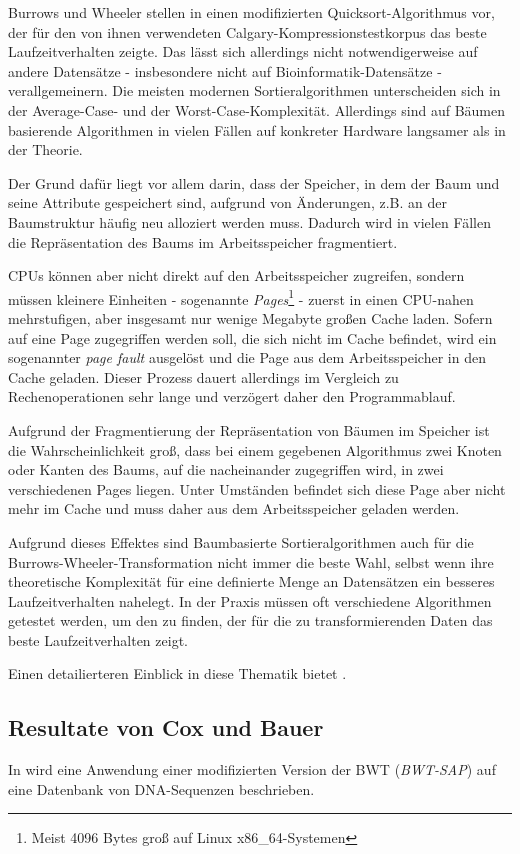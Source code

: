 \documentclass[ngerman,pdftex,paper=A4,DIV=calc,titlepage,12pt]{scrartcl}
\newtheorem[L]{boxedDefinition}{Definition}
\begin{document}
Burrows und Wheeler stellen in \cite{burrows1994block} einen modifizierten Quicksort-Algorithmus vor, der für den von ihnen verwendeten Calgary-Kompressionstestkorpus das beste Laufzeitverhalten zeigte. Das lässt sich allerdings nicht notwendigerweise auf andere Datensätze - insbesondere nicht auf Bioinformatik-Datensätze - verallgemeinern.
Die meisten modernen Sortieralgorithmen unterscheiden sich in der Average-Case- und der Worst-Case-Komplexität. Allerdings sind auf Bäumen basierende Algorithmen in vielen Fällen auf konkreter Hardware langsamer als in der Theorie.

Der Grund dafür liegt vor allem darin, dass der Speicher, in dem der Baum und seine Attribute gespeichert sind, aufgrund von Änderungen, z.B. an der Baumstruktur häufig neu alloziert werden muss. Dadurch wird in vielen Fällen die Repräsentation des Baums im Arbeitsspeicher fragmentiert.

CPUs können aber nicht direkt auf den Arbeitsspeicher zugreifen, sondern müssen kleinere Einheiten - sogenannte \textit{Pages}\footnote{Meist 4096 Bytes groß auf Linux x86\_64-Systemen} - zuerst in einen CPU-nahen mehrstufigen, aber insgesamt nur wenige Megabyte großen Cache laden. Sofern auf eine Page zugegriffen werden soll, die sich nicht im Cache befindet, wird ein sogenannter \textit{page fault} ausgelöst und die Page aus dem Arbeitsspeicher in den Cache geladen. Dieser Prozess dauert allerdings im Vergleich zu Rechenoperationen sehr lange und verzögert daher den Programmablauf.

Aufgrund der Fragmentierung der Repräsentation von Bäumen im Speicher ist die Wahrscheinlichkeit groß, dass bei einem gegebenen Algorithmus zwei Knoten oder Kanten des Baums, auf die nacheinander zugegriffen wird, in zwei verschiedenen Pages liegen. Unter Umständen befindet sich diese Page aber nicht mehr im Cache und muss daher aus dem Arbeitsspeicher geladen werden. 

Aufgrund dieses Effektes sind Baumbasierte Sortieralgorithmen auch für die Burrows-Wheeler-Transformation nicht immer die beste Wahl, selbst wenn ihre theoretische Komplexität für eine definierte Menge an Datensätzen ein besseres Laufzeitverhalten nahelegt. In der Praxis müssen oft verschiedene Algorithmen getestet werden, um den zu finden, der für die zu transformierenden Daten das beste Laufzeitverhalten zeigt.

Einen detailierteren Einblick in diese Thematik bietet \cite{Drepper2007}.
\subsection{Resultate von Cox und Bauer}
In \cite{cox2012large} wird eine Anwendung einer modifizierten Version der BWT (\textit{\glqq BWT-SAP\grqq}) auf eine Datenbank von DNA-Sequenzen beschrieben.
\end{document}
